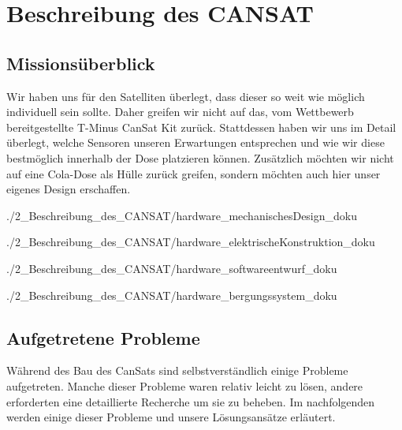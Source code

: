 \section{Beschreibung des CANSAT}


\subsection{Missionsüberblick}
Wir haben uns für den Satelliten überlegt, dass dieser so weit wie möglich individuell sein sollte. Daher greifen wir nicht auf das, vom Wettbewerb bereitgestellte T-Minus CanSat Kit zurück. Stattdessen haben wir uns im Detail überlegt, welche Sensoren unseren Erwartungen entsprechen und wie wir diese bestmöglich innerhalb der Dose platzieren können. Zusätzlich möchten wir nicht auf eine Cola-Dose als Hülle zurück greifen, sondern möchten auch hier unser eigenes Design erschaffen.

 {./2_Beschreibung_des_CANSAT/hardware_mechanischesDesign_doku}

 {./2_Beschreibung_des_CANSAT/hardware_elektrischeKonstruktion_doku}

 {./2_Beschreibung_des_CANSAT/hardware_softwareentwurf_doku}

 {./2_Beschreibung_des_CANSAT/hardware_bergungssystem_doku}

\subsection{Aufgetretene Probleme}
Während des Bau des CanSats sind selbstverständlich einige Probleme aufgetreten. Manche dieser Probleme waren relativ leicht zu lösen, andere erforderten eine detaillierte Recherche um sie zu beheben. Im nachfolgenden werden einige dieser Probleme und unsere Lösungsansätze erläutert.

